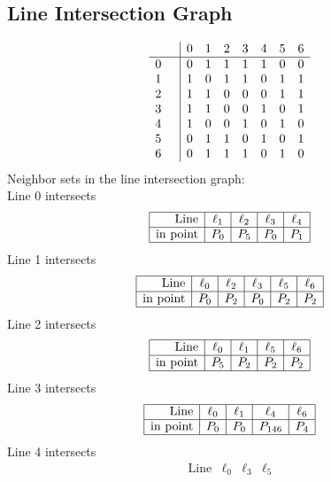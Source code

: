 \documentclass{article}
\begin{document}
{\subsection*{Line Intersection Graph}
{\arraycolsep=1pt
$$
\begin{array}{rr|*{7}r}
 &  & 0 & 1 & 2 & 3 & 4 & 5 & 6\\
\hline
0 &  & 0 & 1 & 1 & 1 & 1 & 0 & 0\\
1 &  & 1 & 0 & 1 & 1 & 0 & 1 & 1\\
2 &  & 1 & 1 & 0 & 0 & 0 & 1 & 1\\
3 &  & 1 & 1 & 0 & 0 & 1 & 0 & 1\\
4 &  & 1 & 0 & 0 & 1 & 0 & 1 & 0\\
5 &  & 0 & 1 & 1 & 0 & 1 & 0 & 1\\
6 &  & 0 & 1 & 1 & 1 & 0 & 1 & 0\\
\end{array}
$$
}%
Neighbor sets in the line intersection graph:\\
Line 0 intersects 
$$
\begin{array}{|r*{4}{|c}|}
\hline
\mbox{Line}  & \ell_{1} & \ell_{2} & \ell_{3} & \ell_{4}\\
\hline
\mbox{in point}  & P_{0} & P_{5} & P_{0} & P_{1}\\
\hline
\end{array}
$$
Line 1 intersects 
$$
\begin{array}{|r*{5}{|c}|}
\hline
\mbox{Line}  & \ell_{0} & \ell_{2} & \ell_{3} & \ell_{5} & \ell_{6}\\
\hline
\mbox{in point}  & P_{0} & P_{2} & P_{0} & P_{2} & P_{2}\\
\hline
\end{array}
$$
Line 2 intersects 
$$
\begin{array}{|r*{4}{|c}|}
\hline
\mbox{Line}  & \ell_{0} & \ell_{1} & \ell_{5} & \ell_{6}\\
\hline
\mbox{in point}  & P_{5} & P_{2} & P_{2} & P_{2}\\
\hline
\end{array}
$$
Line 3 intersects 
$$
\begin{array}{|r*{4}{|c}|}
\hline
\mbox{Line}  & \ell_{0} & \ell_{1} & \ell_{4} & \ell_{6}\\
\hline
\mbox{in point}  & P_{0} & P_{0} & P_{146} & P_{4}\\
\hline
\end{array}
$$
Line 4 intersects 
$$
\begin{array}{|r*{3}{|c}|}
\hline
\mbox{Line}  & \ell_{0} & \ell_{3} & \ell_{5}\\

\end{array}$$}
\end{document}
